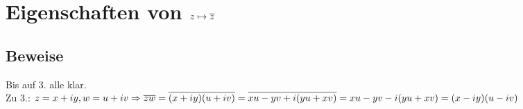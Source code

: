 \section{\texorpdfstring{Eigenschaften von $z \mapsto \overline{z}$}{Eigenschaften von  \textbackslash{mto} \textbackslash{overline} }}\label{6.5}
\enk{
\item $\overline{\overline{z}} = z$
\item $\overline{z+w} = \overline{z} + \overline{w}$
\item $\overline{zw} = \overline{z} \cdot \overline{w}$
\item $z + \overline{z} = 2 \text{ Re } z, z - \overline{z} = 2 \text{ Im } z$
\item $z = \overline{z} \Lra z \in \R$
\item $z = x+iy (x,y) \Ra z \overline{z} = (x+iy)(x-iy) = x^2-i^2 y^2 = x^2 + y^2 \Ra z \overline{z} \in \R_{+} = [0,\infty)$
}

\subsection*{Beweise}
Bis auf 3. alle klar.\\
Zu 3.: $z = x+iy, w=u+iv \Rightarrow \overline{zw} = \overline{(x+iy)(u+iv)} = \overline{xu-yv+i(yu+xv)} = xu-yv-i(yu+xv)=(x-iy)(u-iv)$ \ok